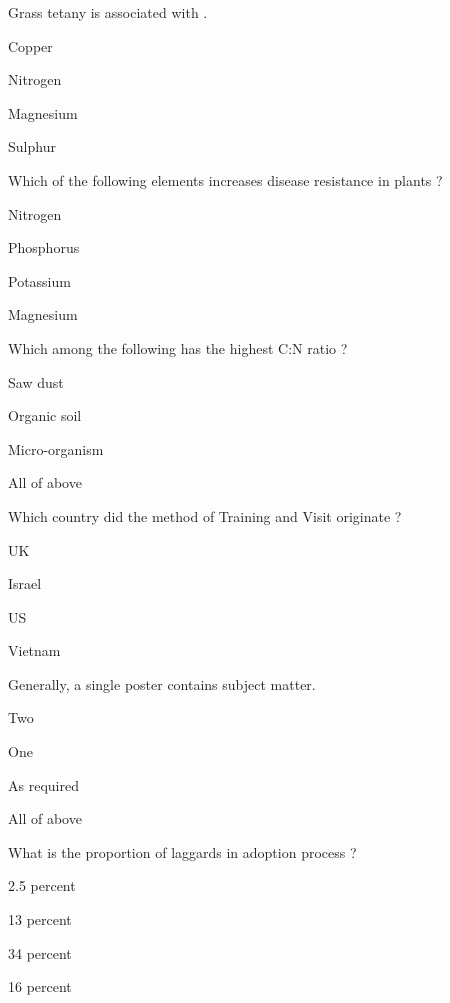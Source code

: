 \begin{questions}
\question Grass tetany is associated with \fillin[][3cm].
\begin{items}
\item Copper
\item Nitrogen
\item* Magnesium
\item Sulphur
\end{items}

\question Which of the following elements increases disease resistance in plants ?
\begin{items}
\item Nitrogen
\item Phosphorus
\item* Potassium
\item Magnesium
\end{items}

\question Which among the following has the highest C:N ratio ?
\begin{items}
\item* Saw dust
\item Organic soil
\item Micro-organism
\item All of above
\end{items}

\question Which country did the method of Training and Visit originate ?
\begin{items}
\item UK
\item* Israel
\item US
\item Vietnam
\end{items}

\question Generally, a single poster contains \fillin[][3cm] subject matter.
\begin{items}
\item Two
\item* One
\item As required
\item All of above
\end{items}

\question What is the proportion of laggards in adoption process ?
\begin{items}
\item 2.5 percent
\item 13 percent
\item 34 percent
\item* 16 percent
\end{items}


\end{questions}
